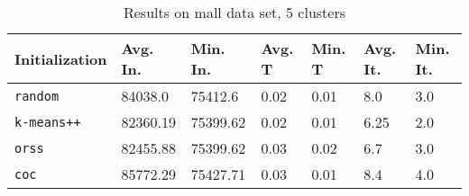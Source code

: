 \begin{table}[h]
	\begin{center}
		\begin{tabular}{|l|l|l|l|l|l|l|}
			\hline
			Initialization & Avg. In. & Min. In. & Avg. T & Min. T & Avg. It. & Min. It.\\\hline
			\texttt{random} & 84038.0 & 75412.6 & 0.02 & 0.01 & 8.0 & 3.0\\\hline
			\texttt{k-means++} & 82360.19 & 75399.62 & 0.02 & 0.01 & 6.25 & 2.0\\\hline
			\texttt{orss} & 82455.88 & 75399.62 & 0.03 & 0.02 & 6.7 & 3.0\\\hline
			\texttt{coc} & 85772.29 & 75427.71 & 0.03 & 0.01 & 8.4 & 4.0\\\hline
		\end{tabular}
		\caption{Results on mall data set, 5 clusters}
		\label{tbl:mall5}
	\end{center}
\end{table}

